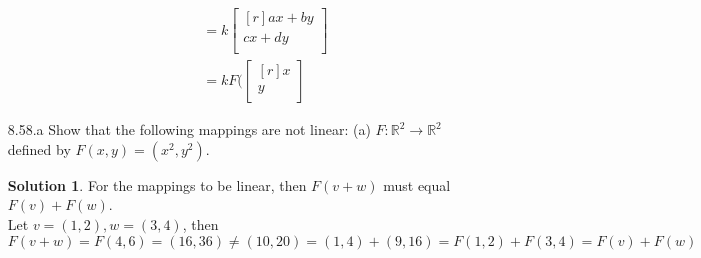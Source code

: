 \documentclass[12pt]{article}
\theoremstyle{definition}
\newtheorem*{solution}{Solution} %
\theoremstyle{plain}
\begin{document}
\begin{enumerate}
\begin{enumerate}
\begin{align*}
	&= k\begin{bmatrix}[r]ax+by\\cx+dy\\\end{bmatrix}\\
	&= kF(\begin{bmatrix}[r]x\\y\\\end{bmatrix}
	\end{align*}
	\end{enumerate}
	
\item[8.58.a] Show that the following mappings are not linear: (a) $F:\mathbb{R}^2\rightarrow\mathbb{R}^2$ defined by $F(x,y)=(x^2,y^2)$.
	\begin{solution}
	For the mappings to be linear, then $F(v+w)$ must equal $F(v)+F(w)$.\\
	Let $v=(1,2),w=(3,4)$, then
	\[ F(v+w) = F(4,6) = (16,36) \neq (10,20) = (1,4) + (9,16) = F(1,2) + F(3,4) = F(v)+F(w) \]
	\end{solution}


\end{enumerate}
\end{document}
